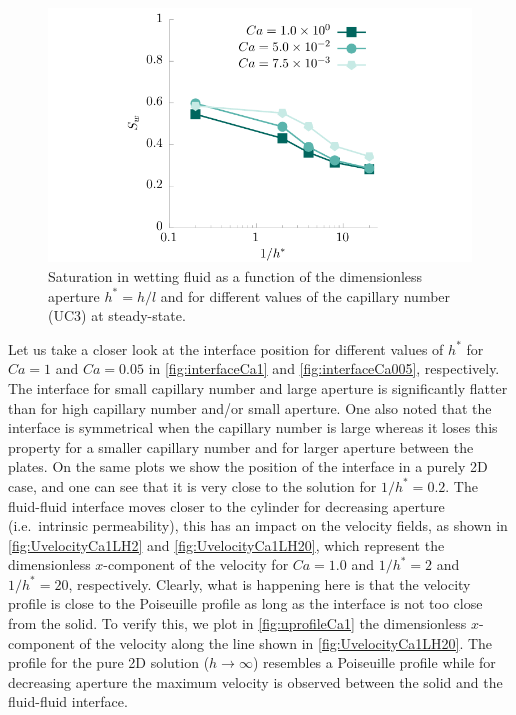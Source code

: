\documentclass[]{article}
\begin{document}
\begin{figure}
\hypertarget{fig:saturation}{%
\centering
\includegraphics{figures/pdf/saturation.pdf}
\caption{Saturation in wetting fluid as a function of the dimensionless
aperture \(h^{*}=h/l\) and for different values of the capillary number
(UC3) at steady-state.}\label{fig:saturation}
}
\end{figure}

Let us take a closer look at the interface position for different values
of \(h^*\) for \(Ca=1\) and \(Ca=0.05\) in \cref{fig:interfaceCa1} and
\cref{fig:interfaceCa005}, respectively. The interface for small
capillary number and large aperture is significantly flatter than for
high capillary number and/or small aperture. One also noted that the
interface is symmetrical when the capillary number is large whereas it
loses this property for a smaller capillary number and for larger
aperture between the plates. On the same plots we show the position of
the interface in a purely 2D case, and one can see that it is very close
to the solution for \(1/h^*=0.2\). The fluid-fluid interface moves
closer to the cylinder for decreasing aperture (i.e.~intrinsic
permeability), this has an impact on the velocity fields, as shown in
\cref{fig:UvelocityCa1LH2} and \cref{fig:UvelocityCa1LH20}, which
represent the dimensionless \(x\)-component of the velocity for
\(Ca=1.0\) and \(1/h^*=2\) and \(1/h^*=20\), respectively. Clearly, what
is happening here is that the velocity profile is close to the
Poiseuille profile as long as the interface is not too close from the
solid. To verify this, we plot in \cref{fig:uprofileCa1} the
dimensionless \(x\)-component of the velocity along the line shown in
\cref{fig:UvelocityCa1LH20}. The profile for the pure 2D solution
(\(h\rightarrow\infty\)) resembles a Poiseuille profile while for
decreasing aperture the maximum velocity is observed between the solid
and the fluid-fluid interface.
\end{document}
